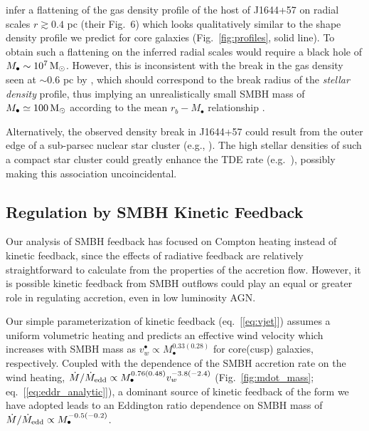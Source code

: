 \documentclass[usenatbib,fleqn]{mn2e}
\newcommand{\Mbh}[1][]{M_{\bullet#1}}
\begin{document}
\citet{BergerZauderer+:2012a} infer a flattening of the gas density
profile of the host of J1644+57 on radial scales $r \gtrsim 0.4$ pc (their Fig.~6) which looks
qualitatively similar to the shape density profile we predict for core
galaxies (Fig.~\ref{fig:profiles}, solid line).  To obtain such a flattening on the inferred radial scales would require a black hole of $\Mbh\sim 10^7 \Msun$.  However,  this is inconsistent with the break in the gas density seen at $\sim 0.6$ pc by \citet{BergerZauderer+:2012a}, which should correspond to the break radius of the {\it stellar density} profile, thus implying an unrealistically small SMBH mass of $\Mbh\simeq 100\Msun$ according to the mean $r_b-M_{\bullet}$ relationship \citep{LauerFaber+:2007a}.  

Alternatively, the observed density break in J1644+57 could result from the outer edge of a sub-parsec nuclear star cluster (e.g., \citealt{Carson+15}).  The high stellar densities of such a compact star cluster could greatly enhance the TDE rate (e.g.~\citealt{Stone&Metzger15}), possibly making this association uncoincidental.


\subsection{Regulation by SMBH Kinetic Feedback}
\label{sec:kinetic}

Our analysis of SMBH feedback has focused on Compton heating
instead of kinetic feedback, since the effects of radiative feedback
are relatively straightforward to calculate from the properties of the
accretion flow.  However, it is possible kinetic feedback from SMBH outflows could play an equal or greater role in regulating accretion, even in low luminosity AGN.

Our simple parameterization of kinetic feedback (eq.~[\ref{eq:vjet}]) assumes a uniform volumetric heating and predicts an
effective wind velocity which increases with SMBH mass as
$v_{w}^{\bullet} \propto M_{\bullet}^{0.33(0.28)}$ for core(cusp)
galaxies, respectively.  Coupled with the dependence of the SMBH
accretion rate on the wind heating, $\dot{M}/\dot{M}_{\rm edd} \propto
M_{\bullet}^{0.76(0.48)}v_{w}^{-3.8(-2.4)}$ (Fig.~\ref{fig:mdot_mass};
eq.~[\ref{eq:eddr_analytic}]), a dominant source of kinetic feedback of the form we have
adopted leads to an Eddington ratio dependence on SMBH mass of
$\dot{M}/\dot{M}_{\rm edd} \propto M_{\bullet}^{-0.5(-0.2)}$.
\end{document}
